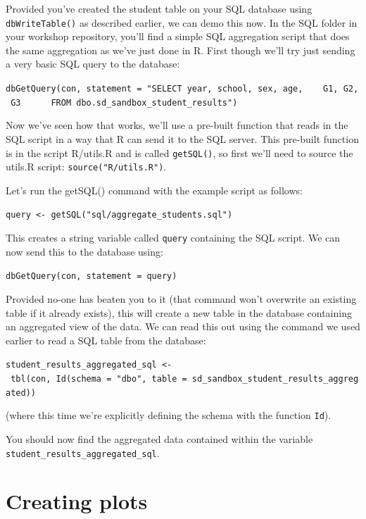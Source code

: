 \documentclass[
  12pt,
]{article}
\begin{document}
Provided you've created the student table on your SQL database using
\texttt{dbWriteTable()} as described earlier, we can demo this now. In
the SQL folder in your workshop repository, you'll find a simple SQL
aggregation script that does the same aggregation as we've just done in
R. First though we'll try just sending a very basic SQL query to the
database:

\texttt{dbGetQuery(con,\ statement\ =\ "SELECT\ year,\ school,\ sex,\ age,\ \ \ \ G1,\ G2,\ G3\ \ \ \ \ \ FROM\ dbo.sd\_sandbox\_student\_results")}

Now we've seen how that works, we'll use a pre-built function that reads
in the SQL script in a way that R can send it to the SQL server. This
pre-built function is in the script R/utils.R and is called
\texttt{getSQL()}, so first we'll need to source the utils.R script:
\texttt{source("R/utils.R")}.

Let's run the getSQL() command with the example script as follows:

\texttt{query\ \textless{}-\ getSQL("sql/aggregate\_students.sql")}

This creates a string variable called \texttt{query} containing the SQL
script. We can now send this to the database using:

\texttt{dbGetQuery(con,\ statement\ =\ query)}

Provided no-one has beaten you to it (that command won't overwrite an
existing table if it already exists), this will create a new table in
the database containing an aggregated view of the data. We can read this
out using the command we used earlier to read a SQL table from the
database:

\texttt{student\_results\_aggregated\_sql\ \textless{}-\ tbl(con,\ Id(schema\ =\ "dbo",\ table\ =\ \textquotesingle{}sd\_sandbox\_student\_results\_aggregated\textquotesingle{}))}

(where this time we're explicitly defining the schema with the function
\texttt{Id}).

You should now find the aggregated data contained within the variable
\texttt{student\_results\_aggregated\_sql}.

\hypertarget{creating-plots}{%
\section{Creating plots}\label{creating-plots}}
\end{document}
